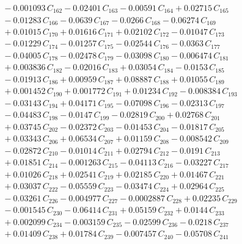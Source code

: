 \documentclass[a4paper,11pt]{article}
\begin{document}
\begin{align}
&\quad - 0.001093\,C_{162} - 0.02401\,C_{163} - 0.00591\,C_{164} + 0.02715\,C_{165} \nonumber\\
&\quad - 0.01283\,C_{166} - 0.0639\,C_{167} - 0.0266\,C_{168} - 0.06274\,C_{169} \nonumber\\
&\quad + 0.01015\,C_{170} + 0.01616\,C_{171} + 0.02102\,C_{172} - 0.01047\,C_{173} \nonumber\\
&\quad - 0.01229\,C_{174} - 0.01257\,C_{175} - 0.02544\,C_{176} - 0.0363\,C_{177} \nonumber\\
&\quad - 0.04005\,C_{178} - 0.02478\,C_{179} - 0.03098\,C_{180} - 0.006474\,C_{181} \nonumber\\
&\quad + 0.003836\,C_{182} - 0.02016\,C_{183} + 0.03054\,C_{184} - 0.0153\,C_{185} \nonumber\\
&\quad - 0.01913\,C_{186} + 0.00959\,C_{187} + 0.08887\,C_{188} + 0.01055\,C_{189} \nonumber\\
&\quad + 0.001452\,C_{190} + 0.001772\,C_{191} + 0.01234\,C_{192} - 0.008384\,C_{193} \nonumber\\
&\quad - 0.03143\,C_{194} + 0.04171\,C_{195} - 0.07098\,C_{196} - 0.02313\,C_{197} \nonumber\\
&\quad - 0.04483\,C_{198} - 0.0147\,C_{199} - 0.02819\,C_{200} + 0.02768\,C_{201} \nonumber\\
&\quad + 0.03745\,C_{202} - 0.02372\,C_{203} - 0.01453\,C_{204} - 0.01817\,C_{205} \nonumber\\
&\quad + 0.03343\,C_{206} + 0.06534\,C_{207} + 0.01159\,C_{208} - 0.008542\,C_{209} \nonumber\\
&\quad - 0.02872\,C_{210} - 0.01014\,C_{211} + 0.02794\,C_{212} - 0.0191\,C_{213} \nonumber\\
&\quad + 0.01851\,C_{214} - 0.001263\,C_{215} - 0.04113\,C_{216} - 0.03227\,C_{217} \nonumber\\
&\quad + 0.01026\,C_{218} + 0.02541\,C_{219} + 0.02185\,C_{220} + 0.01467\,C_{221} \nonumber\\
&\quad + 0.03037\,C_{222} - 0.05559\,C_{223} - 0.03474\,C_{224} + 0.02964\,C_{225} \nonumber\\
&\quad - 0.03261\,C_{226} - 0.004977\,C_{227} - 0.0002887\,C_{228} + 0.02235\,C_{229} \nonumber\\
&\quad - 0.001545\,C_{230} - 0.06414\,C_{231} + 0.05159\,C_{232} + 0.0144\,C_{233} \nonumber\\
&\quad + 0.002099\,C_{234} - 0.003159\,C_{235} - 0.02599\,C_{236} - 0.0218\,C_{237} \nonumber\\
&\quad + 0.01409\,C_{238} + 0.01784\,C_{239} - 0.007457\,C_{240} - 0.05708\,C_{241} \nonumber\\

\end{align}
\end{document}
